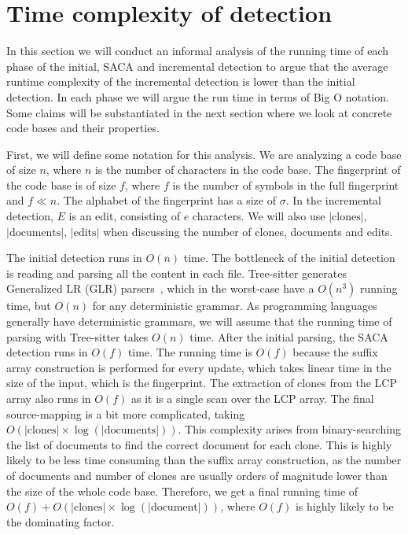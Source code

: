 \section{Time complexity of detection}

In this section we will conduct an informal analysis of the running time of each phase of
the initial, SACA and incremental detection to argue that the average runtime complexity
of the incremental detection is lower than the initial detection. In each phase we will
argue the run time in terms of Big O notation. Some claims will be substantiated in the
next section where we look at concrete code bases and their properties.

First, we will define some notation for this analysis. We are analyzing a code base of
size $n$, where $n$ is the number of characters in the code base. The fingerprint of the
code base is of size $f$, where $f$ is the number of symbols in the full fingerprint and
$f \ll n$. The alphabet of the fingerprint has a size of $\sigma$. In the incremental
detection, $E$ is an edit, consisting of $e$ characters. We will also use
$\vert\text{clones}\vert$, $\vert\text{documents}\vert$, $\vert\text{edits}\vert$ when
discussing the number of clones, documents and edits.

The initial detection runs in $O(n)$ time. The bottleneck of the initial detection is
reading and parsing all the content in each file. Tree-sitter generates Generalized LR
(GLR) parsers~\cite{GLR}, which in the worst-case have a $O(n^3)$ running time, but $O(n)$
for any deterministic grammar. As programming languages generally have deterministic
grammars, we will assume that the running time of parsing with Tree-sitter takes $O(n)$
time. After the initial parsing, the SACA detection runs in $O(f)$ time. The running time
is $O(f)$ because the suffix array construction is performed for every update, which takes
linear time in the size of the input, which is the fingerprint. The extraction of clones
from the LCP array also runs in $O(f)$ as it is a single scan over the LCP array. The
final source-mapping is a bit more complicated, taking $O(\vert\text{clones}\vert \times
\log (\vert\text{documents}\vert))$. This complexity arises from binary-searching the list
of documents to find the correct document for each clone. This is highly likely to be less
time consuming than the suffix array construction, as the number of documents and number
of clones are usually orders of magnitude lower than the size of the whole code base.
Therefore, we get a final running time of $O(f) + O(\vert\text{clones}\vert \times
\log(\vert\text{document}\vert))$, where $O(f)$ is highly likely to be the dominating
factor.

